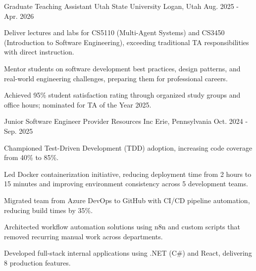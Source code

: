 \documentclass[11pt, letterpaper]{awesome-cv}
\begin{document}
\begin{cventries}
  \cventry
    {Graduate Teaching Assistant}
    {Utah State University}
    {Logan, Utah}
    {Aug. 2025 - Apr. 2026}
    {
      \begin{cvitems}
        \item {Deliver lectures and labs for CS5110 (Multi-Agent Systems) and CS3450 (Introduction to Software Engineering), exceeding traditional TA responsibilities with direct instruction.}
        \item {Mentor students on software development best practices, design patterns, and real-world engineering challenges, preparing them for professional careers.}
        \item {Achieved 95\% student satisfaction rating through organized study groups and office hours; nominated for TA of the Year 2025.}
      \end{cvitems}
    }

  \cventry
    {Junior Software Engineer}
    {Provider Resources Inc}
    {Erie, Pennsylvania}
    {Oct. 2024 - Sep. 2025}
    {
      \begin{cvitems}
        \item {Championed Test-Driven Development (TDD) adoption, increasing code coverage from 40\% to 85\%.}
        \item {Led Docker containerization initiative, reducing deployment time from 2 hours to 15 minutes and improving environment consistency across 5 development teams.}
        \item {Migrated team from Azure DevOps to GitHub with CI/CD pipeline automation, reducing build times by 35\%.}
        \item {Architected workflow automation solutions using n8n and custom scripts that removed recurring manual work across departments.}
        \item {Developed full-stack internal applications using .NET (C\#) and React, delivering 8 production features.}
      \end{cvitems}
    }

\end{cventries}

\end{document}
